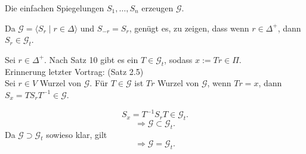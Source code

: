 \documentclass{article}
\begin{document}
\begin{satz} %
    Die einfachen Spiegelungen \( S_1, \ldots, S_n \) 
    erzeugen \( \mathscr{G} \).
\end{satz}

\begin{bew}
    Da \( \mathscr{G} = \langle S_r \;\vert\; r \in \Delta \rangle \) 
    und \( S_{-r} = S_r \), genügt es, zu zeigen, dass wenn 
    \( r\in \Delta^+ \), dann \( S_r \in \mathscr{G}_t \).

    Sei \( r \in \Delta^+ \). Nach Satz 10 gibt es 
    ein \( T \in \mathscr{G}_t \), sodass 
    \( x := Tr \in \Pi \).\\

    Erinnerung letzter Vortrag: (Satz 2.5)\\
    Sei \( r \in V \) Wurzel von \( \mathscr{G} \). 
    Für \( T \in \mathscr{G} \) ist \( Tr \) Wurzel von \(\mathscr{G}\), 
    wenn \( Tr = x \), dann \( S_x = T S_r T^{-1} \in \mathscr{G} \).

    \[ S_x = T^{-1} S_r T \in \mathscr{G}_t. \]
    \[ \Rightarrow \mathscr{G} \subset \mathscr{G}_t. \]
    Da \( \mathscr{G} \supset \mathscr{G}_t \) sowieso klar, gilt
    \[ \Rightarrow \mathscr{G} = \mathscr{G}_t. \]
\end{bew}
\end{document}

